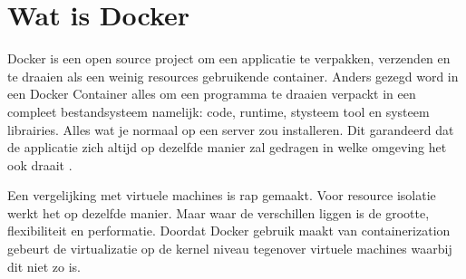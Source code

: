 \section{Wat is Docker}

Docker is een open source project om een applicatie te verpakken, verzenden en te draaien als een weinig resources gebruikende container. Anders gezegd word in een Docker Container alles om een programma te draaien verpackt in een compleet bestandsysteem namelijk: code, runtime, stysteem tool en systeem librairies. Alles wat je normaal op een server zou installeren. Dit garandeerd dat de applicatie zich altijd op dezelfde manier zal gedragen in welke omgeving het ook draait \cite{Docker2016d}.

Een vergelijking met virtuele machines is rap gemaakt. Voor resource isolatie werkt het op dezelfde manier. Maar waar de verschillen liggen is de grootte, flexibiliteit en performatie. Doordat Docker gebruik maakt van containerization gebeurt de virtualizatie op de kernel niveau tegenover virtuele machines waarbij dit niet zo is. 

